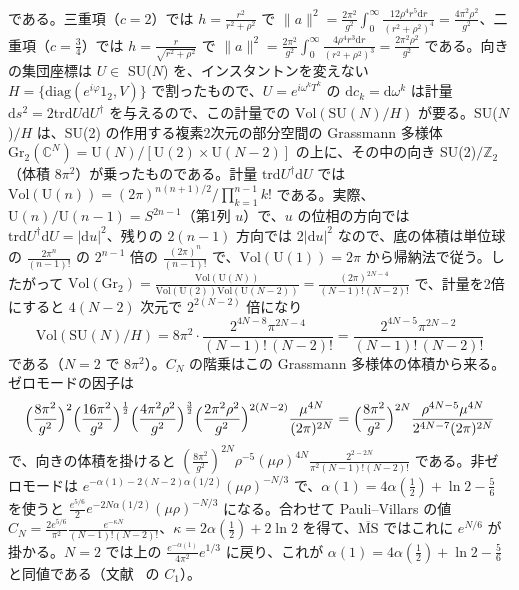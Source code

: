 \documentclass[a4paper,10pt]{ltjsarticle}
\newcommand{\dd}{\mathrm{d}}
\newcommand{\MSbar}{\overline{\mathrm{MS}}}
\newcommand{\tr}{\mathrm{tr}}
\begin{document}
である。三重項（$c=2$）では $h=\frac{r^2}{r^2+\rho^2}$ で $\|a\|^2=\frac{2\pi^2}{g^2}\int_0^\infty\frac{12\rho^4r^5\dd r}{(r^2+\rho^2)^4}=\frac{4\pi^2\rho^2}{g^2}$、二重項（$c=\frac34$）では $h=\frac r{\sqrt{r^2+\rho^2}}$ で $\|a\|^2=\frac{2\pi^2}{g^2}\int_0^\infty\frac{4\rho^4r^3\dd r}{(r^2+\rho^2)^3}=\frac{2\pi^2\rho^2}{g^2}$ である。向きの集団座標は $U\in$ SU($N$) を、インスタントンを変えない $H=\{\mathrm{diag}(e^{i\varphi}1_2,V)\}$ で割ったもので、$U=e^{i\omega^kT^k}$ の $\dd c_k=\dd\omega^k$ は計量 $\dd s^2=2\tr\dd U\dd U^\dagger$ を与えるので、この計量での $\mathrm{Vol}(\mathrm{SU}(N)/H)$ が要る。SU($N$)$/H$ は、SU(2) の作用する複素2次元の部分空間の Grassmann 多様体 $\mathrm{Gr}_2(\mathbb C^N)=\mathrm U(N)/[\mathrm U(2)\times\mathrm U(N-2)]$ の上に、その中の向き SU(2)$/\mathbb Z_2$（体積 $8\pi^2$）が乗ったものである。計量 $\tr\dd U^\dagger\dd U$ では $\mathrm{Vol}(\mathrm U(n))=(2\pi)^{n(n+1)/2}/\prod_{k=1}^{n-1}k!$ である。実際、$\mathrm U(n)/\mathrm U(n-1)=S^{2n-1}$（第1列 $u$）で、$u$ の位相の方向では $\tr\dd U^\dagger\dd U=|\dd u|^2$、残りの $2(n-1)$ 方向では $2|\dd u|^2$ なので、底の体積は単位球の $\frac{2\pi^n}{(n-1)!}$ の $2^{n-1}$ 倍の $\frac{(2\pi)^n}{(n-1)!}$ で、$\mathrm{Vol}(\mathrm U(1))=2\pi$ から帰納法で従う。したがって $\mathrm{Vol}(\mathrm{Gr}_2)=\frac{\mathrm{Vol}(\mathrm U(N))}{\mathrm{Vol}(\mathrm U(2))\mathrm{Vol}(\mathrm U(N-2))}=\frac{(2\pi)^{2N-4}}{(N-1)!(N-2)!}$ で、計量を2倍にすると $4(N-2)$ 次元で $2^{2(N-2)}$ 倍になり
\begin{equation*}
\mathrm{Vol}(\mathrm{SU}(N)/H)=8\pi^2\cdot\frac{2^{4N-8}\pi^{2N-4}}{(N-1)!\,(N-2)!}=\frac{2^{4N-5}\pi^{2N-2}}{(N-1)!\,(N-2)!}
\end{equation*}
である（$N=2$ で $8\pi^2$）。$C_N$ の階乗はこの Grassmann 多様体の体積から来る。ゼロモードの因子は
\begin{equation*}
\Bigl(\frac{8\pi^2}{g^2}\Bigr)^2\Bigl(\frac{16\pi^2}{g^2}\Bigr)^{\frac12}\Bigl(\frac{4\pi^2\rho^2}{g^2}\Bigr)^{\frac32}\Bigl(\frac{2\pi^2\rho^2}{g^2}\Bigr)^{2(N-2)}\frac{\mu^{4N}}{(2\pi)^{2N}}=\Bigl(\frac{8\pi^2}{g^2}\Bigr)^{2N}\frac{\rho^{4N-5}\mu^{4N}}{2^{4N-7}(2\pi)^{2N}}
\end{equation*}
で、向きの体積を掛けると $(\frac{8\pi^2}{g^2})^{2N}\rho^{-5}(\mu\rho)^{4N}\frac{2^{2-2N}}{\pi^2(N-1)!(N-2)!}$ である。非ゼロモードは $e^{-\alpha(1)-2(N-2)\alpha(1/2)}(\mu\rho)^{-N/3}$ で、$\alpha(1)=4\alpha(\frac12)+\ln2-\frac56$ を使うと $\frac{e^{5/6}}2e^{-2N\alpha(1/2)}(\mu\rho)^{-N/3}$ になる。合わせて Pauli--Villars の値 $C_N=\frac{2e^{5/6}}{\pi^2}\frac{e^{-\kappa N}}{(N-1)!(N-2)!}$、$\kappa=2\alpha(\frac12)+2\ln2$ を得て、$\MSbar$ ではこれに $e^{N/6}$ が掛かる。$N=2$ では上の $\frac{e^{-\alpha(1)}}{4\pi^2}e^{1/3}$ に戻り、これが $\alpha(1)=4\alpha(\frac12)+\ln2-\frac56$ と同値である（文献~\cite{fm25} の $C_1$）。
\end{document}
